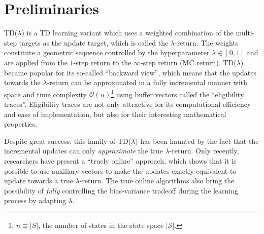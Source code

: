\documentclass{article}
\newcommand\scriptS{\mathcal{S}}
\newcommand\scriptO{\mathcal{O}}
\begin{document}
\section{Preliminaries}\label{sec:preliminaries}
TD($\lambda$) \cite{Singh1996} is a TD learning variant which uses a weighted combination of the multi-step targets as the update target, which is called the $\lambda$-return. The weights constitute a geometric sequence controlled by the hyperparameter $\lambda \in [0, 1]$ and are applied from the $1$-step return to the $\infty$-step return (MC return). TD($\lambda$) became popular for its so-called ``backward view'', which means that the updates towards the $\lambda$-return can be approximated in a fully incremental manner with space and time complexity $\scriptO(n)$\footnote{$n \equiv |S|$, the number of states in the state space $|\scriptS|$.} using buffer vectors called the ``eligibility traces''. Eligibility traces are not only attractive for its computational efficiency and ease of implementation, but also for their interesting mathematical properties.
\par
Despite great success, this family of TD($\lambda$) has been haunted by the fact that the incremental updates can only \textit{approximate} the true $\lambda$-return. Only recently, researchers have present a ``truely online'' approach, which shows that it is possible to use auxiliary vectors to make the updates exactly equivalent to update towards a true $\lambda$-return. The true online algorithms also bring the possibility of \textit{fully} controlling the bias-variance tradeoff during the learning process by adapting $\lambda$.
\end{document}
